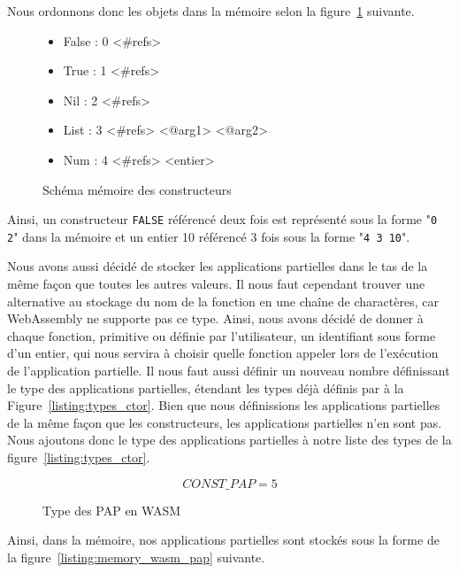 \documentclass{rapportECL}
\begin{document}
Nous ordonnons donc les objets dans la mémoire selon la figure~\ref{listing:memory_wasm} suivante.

\begin{figure}[H]
	\begin{itemize}
		\item False : 0 <\#refs>
		\item True  : 1 <\#refs>
		\item Nil   : 2 <\#refs>
		\item List  : 3 <\#refs> <@arg1> <@arg2>
		\item Num   : 4 <\#refs> <entier>
	\end{itemize}
	\caption{Schéma mémoire des constructeurs}
	\label{listing:memory_wasm}
\end{figure}

Ainsi, un constructeur \verb|FALSE| référencé deux fois est représenté sous la forme "\verb|0 2|" dans la mémoire et un entier 10 
référencé 3 fois sous la forme "\verb|4 3 10|".

\bigskip

Nous avons aussi décidé de stocker les applications partielles dans le tas de la même façon que toutes les autres valeurs.
Il nous faut cependant trouver une alternative au stockage du nom de la fonction en une chaîne de charactères, car WebAssembly
ne supporte pas ce type. Ainsi, nous avons décidé de donner à chaque fonction, primitive ou définie par l'utilisateur, un identifiant
sous forme d'un entier, qui nous servira à choisir quelle fonction appeler lors de l'exécution de l'application partielle.
Il nous faut aussi définir un nouveau nombre définissant le type des applications partielles, étendant les types déjà définis
par à la Figure~\ref{listing:types_ctor}. Bien que nous définissions les applications partielles de la même façon que les constructeurs,
les applications partielles n'en sont pas. 
Nous ajoutons donc le type des applications partielles à notre liste des types de la figure~\ref{listing:types_ctor}.


\begin{figure}[H]
	\begin{equation*}
	CONST\_PAP = 5
	\end{equation*}
	\caption{Type des PAP en WASM}
	\label{listing:types_pap_wasm}
	\end{figure}
	\FloatBarrier 

Ainsi, dans la mémoire, nos applications partielles sont stockés sous la forme de la figure~\ref{listing:memory_wasm_pap} suivante.
\end{document}
